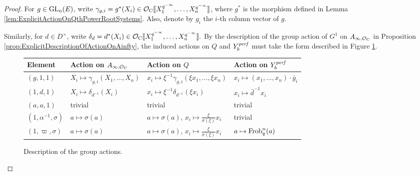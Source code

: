 \documentclass[../main.tex]{subfiles}
\begin{document}
\begin{proof}
For $g \in \operatorname{GL}_n(E)$, write $\gamma_{g,i} = g^*(X_i) 
\in \mathcal{O}_{\mathrm{C}} \llbracket X_1^{q^{-\infty}}, \dots, X_n^{q^{-\infty}} \rrbracket$, where 
$g^*$ is the morphism defined in Lemma \ref{lem:ExplicitActionOnQthPowerRootSystems}.
 Also, denote by $g_i$ the $i$-th column vector of $g$.

Similarly, for $d \in D^\times$, write $\delta_d = d^*(X_i) \in \mathcal{O}_{\mathrm{C}}\llbracket
X_1^{q^{-\infty}}, \dots, X_n^{q^{-\infty}} \rrbracket.$
By the description of the group action of $G^1$ on $A_{\infty, \mathcal{O}_{\mathrm{C}}}$
in Proposition \ref{prop:ExplicitDescriptionOfActionOnAinfty}, the induced
actions on $Q$ and $Y_b^{\mathit{perf}}$ must take the form described in Figure
\ref{fig:TableOfGroupActionsOnModels}. 

\begin{figure}[H] 
\centering
\begin{center}
\begin{tabularx} {0.95\textwidth} { 
  |>{\centering\arraybackslash}X ||>{\centering\arraybackslash}X
  |>{\centering\arraybackslash}X |>{\centering\arraybackslash}X | }
 \hline
 Element & Action on $A_{\infty,\mathcal{O}_{\mathrm{C}}}$ & Action on $Q$ & Action on
 $Y_b^{\mathit{perf}}$ \\ [0.5ex] 
 \hline\hline
 $(g,1,1)$ & $X_i \mapsto \gamma_{g,i}(X_1, \dots, X_n)$ & $x_i \mapsto
 \xi^{-1}\gamma_{g,i}(\xi x_1, \dots, \xi x_n)$ & $x_i \mapsto
 (x_1, \dots, x_n)\cdot\bar g_i$\\ 
 \hline
$(1,d,1)$ & $X_i \mapsto \delta_{d^{-1}}(X_i)$ & $x_i \mapsto \xi^{-1}
\delta_{d^{-1}}(\xi x_i)$ & $x_i \mapsto \bar d^{-1} x_i$ \\
 \hline
 $(a,a,1)$ & trivial & trivial & trivial \\
 \hline
 $(1, \alpha^{-1}, \sigma)$ & $a \mapsto \sigma(a)$& $a \mapsto \sigma(a)$, $x_i \mapsto  \tfrac{\xi}{\sigma(\xi)} x_i$ & trivial \\
 \hline
 $(1, \varpi, \sigma)$ & $a \mapsto \sigma(a)$& $a \mapsto \sigma(a)$, $x_i \mapsto
 \tfrac{\xi}{\sigma(\xi)} x_i$ & $a
 \mapsto \mathrm{Frob}_q^n(a)$ \\ [1ex] 
 \hline
\end{tabularx}
\end{center}
\caption{Description of the group actions.}
\label{fig:TableOfGroupActionsOnModels}
\end{figure}


\end{proof}
\end{document}
